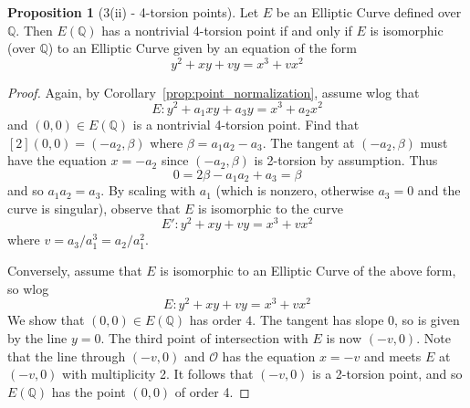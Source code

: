 \documentclass{scrartcl}
\newcommand{\Q}{\mathbb{Q}}
\renewcommand{\O}{\mathcal{O}}
\theoremstyle{definition}
\newtheorem{prop}[subsection]{Proposition}
\begin{document}
\begin{prop}[3(ii) - 4-torsion points]
    Let $E$ be an Elliptic Curve defined over $\Q$.
    Then $E(\Q)$ has a nontrivial 4-torsion point if and only if $E$ is isomorphic (over $\Q$) to an Elliptic Curve given by an equation of the form
    \begin{equation*}
        y^2 + x y + v y = x^3 + v x^2
    \end{equation*}
\end{prop}
\begin{proof}
    Again, by Corollary~\ref{prop:point_normalization}, assume wlog that
    \begin{equation*}
        E: y^2 + a_1 x y + a_3 y = x^3 + a_2 x^2
    \end{equation*}
    and $(0, 0) \in E(\Q)$ is a nontrivial 4-torsion point.
    Find that $[2](0, 0) = (-a_2, \beta)$ where $\beta = a_1 a_2 - a_3$.
    The tangent at $(-a_2, \beta)$ must have the equation $x = -a_2$ since $(-a_2, \beta)$ is 2-torsion by assumption.
    Thus
    \begin{equation*}
        0 = 2\beta - a_1a_2 + a_3 = \beta
    \end{equation*}
    and so $a_1a_2 = a_3$.
    By scaling with $a_1$ (which is nonzero, otherwise $a_3 = 0$ and the curve is singular), observe that $E$ is isomorphic to the curve
    \begin{equation*}
        E': y^2 + x y + v y = x^3 + v x^2
    \end{equation*}
    where $v = a_3 / a_1^3 = a_2 / a_1^2$.

    Conversely, assume that $E$ is isomorphic to an Elliptic Curve of the above form, so wlog
    \begin{equation*}
        E: y^2 + x y + v y = x^3 + v x^2
    \end{equation*}
    We show that $(0, 0) \in E(\Q)$ has order $4$.
    The tangent has slope $0$, so is given by the line $y = 0$.
    The third point of intersection with $E$ is now $(-v, 0)$.
    Note that the line through $(-v, 0)$ and $\O$ has the equation $x = -v$ and meets $E$ at $(-v, 0)$ with multiplicity 2.
    It follows that $(-v, 0)$ is a 2-torsion point, and so $E(\Q)$ has the point $(0, 0)$ of order 4.
\end{proof}
\end{document}
